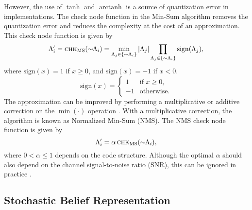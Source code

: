 \documentclass[12pt,journal,twoside,draftcls,onecolumn]{IEEEtran}
\newcommand{\atanh}{\operatorname{arctanh}}
\begin{document}
However, the use of $\tanh$ and $\atanh$ is a source of quantization error in implementations.
The check node function in the Min-Sum algorithm \cite{fossorier:1999} removes the quantization error and reduces the complexity at the cost of an approximation. This check node function is given by
\begin{equation}
\label{eqn_chkms}
\Lambda_{i}' = \textsc{chk}_{\mathrm{MS}}(\sim \! \! \Lambda_i)
	= \min_{\Lambda_j \in \{\sim \Lambda_i \}} |\Lambda_j| \prod_{\Lambda_j \in \{\sim \Lambda_i \}} \mathrm{sign}(\Lambda_j),
\end{equation}
where
\ifCLASSOPTIONdraftcls
$\mathrm{sign}(x)=1$ if $x \geq 0$, and $\mathrm{sign}(x)=-1$ if $x < 0$.
\else \begin{equation*}
\mathrm{sign}(x)=
\begin{cases}
	1 & \text{if $x \geq 0$,} \\
	-1 & \text{otherwise.}
\end{cases}
\end{equation*}
\fi
The approximation can be improved by performing a multiplicative or additive correction on the $\min(\cdot)$ operation \cite{chen:2002,zhao:2005}. 
With a multiplicative correction, the algorithm is known as Normalized Min-Sum (NMS). The NMS check node function is given by
\begin{equation}
\label{eqn_nmschk}
\Lambda_{i}' = \alpha \, \textsc{chk}_{\mathrm{MS}}(\sim \! \! \Lambda_i),
\end{equation}
where $0 < \alpha \leq 1$ depends on the code structure. Although the optimal $\alpha$ should also depend on the channel signal-to-noise ratio (SNR), this can be ignored in practice \cite{chen:2002}.

\subsection{Stochastic Belief Representation}
\label{sect_background_stoch}
\end{document}
